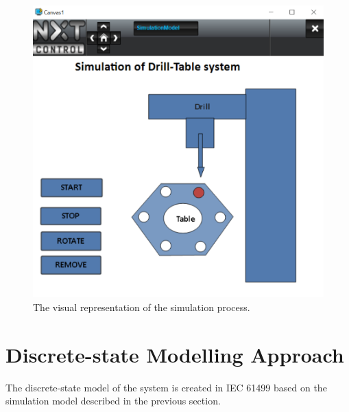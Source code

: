 \documentclass[conference]{IEEEtran}
\begin{document}
\begin{figure}
    \centering
    \includegraphics[scale = 0.30]{images/DT_HMI5.PNG}
    \caption{The visual representation of the simulation process.}
    \label{figure:SimulationDiagram}
\end{figure}

\section{Discrete-state Modelling Approach}

The discrete-state model of the system is created in IEC 61499 based on the simulation model described in the previous section. 


\end{document}
